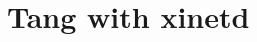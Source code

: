\documentclass[../xdudla00-porting-Tang-to-Open-WRT.tex]{subfiles}
\begin{document}
\chapter{Tang with xinetd}\label{tangservice}
\end{document}
